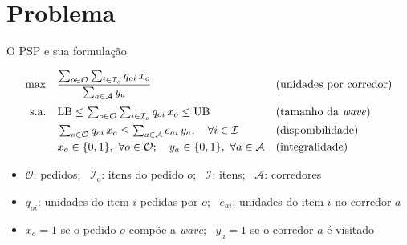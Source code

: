 \documentclass{beamer}
\begin{document}
\section{Problema}

\begin{frame}{O PSP e sua formulação}
    \footnotesize

    \begin{align*}
        \max \quad & \frac{\sum_{o \in \mathcal{O}} \sum_{i \in \mathcal{I}_o} q_{oi}\, x_o}{\sum_{a \in \mathcal{A}} y_a}
                   &                                                                                                                             & \text{(unidades por corredor)}    \\[2pt]
        \text{s.a.} \quad
                   & \mathrm{LB} \leq \textstyle\sum_{o \in \mathcal{O}} \sum_{i \in \mathcal{I}_o} q_{oi}\, x_o \leq \mathrm{UB}
                   &                                                                                                                             & \text{(tamanho da \textit{wave})} \\
                   & \textstyle\sum_{o \in \mathcal{O}} q_{oi}\, x_o \leq \sum_{a \in \mathcal{A}} e_{ai}\, y_a, \quad \forall i \in \mathcal{I}
                   &                                                                                                                             & \text{(disponibilidade)}          \\
                   & x_o \in \{0,1\},\ \forall o \in \mathcal{O}; \quad y_a \in \{0,1\},\ \forall a \in \mathcal{A}
                   &                                                                                                                             & \text{(integralidade)}
    \end{align*}

    \medskip
    \begin{itemize}
        \item $\mathcal{O}$: pedidos; \ $\mathcal{I}_o$: itens do pedido $o$; \ $\mathcal{I}$: itens; \ $\mathcal{A}$: corredores
        \item $q_{oi}$: unidades do item $i$ pedidas por $o$; \ $e_{ai}$: unidades do item $i$ no corredor $a$
        \item $x_o = 1$ se o pedido $o$ compõe a \textit{wave}; \ $y_a = 1$ se o corredor $a$ é visitado
    \end{itemize}

\end{frame}
\end{document}
